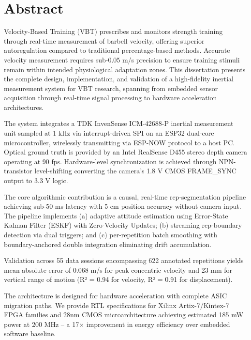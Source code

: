 \documentclass[12pt,a4paper,oneside]{book}
\begin{document}
\chapter*{Abstract}

Velocity-Based Training (VBT) prescribes and monitors strength training through real-time measurement of barbell velocity, offering superior autoregulation compared to traditional percentage-based methods. Accurate velocity measurement requires sub-0.05 m/s precision to ensure training stimuli remain within intended physiological adaptation zones. This dissertation presents the complete design, implementation, and validation of a high-fidelity inertial measurement system for VBT research, spanning from embedded sensor acquisition through real-time signal processing to hardware acceleration architectures.

The system integrates a TDK InvenSense ICM-42688-P inertial measurement unit sampled at 1 kHz via interrupt-driven SPI on an ESP32 dual-core microcontroller, wirelessly transmitting via ESP-NOW protocol to a host PC. Optical ground truth is provided by an Intel RealSense D455 stereo depth camera operating at 90 fps. Hardware-level synchronization is achieved through NPN-transistor level-shifting converting the camera's 1.8 V CMOS FRAME\_SYNC output to 3.3 V logic.

The core algorithmic contribution is a causal, real-time rep-segmentation pipeline achieving sub-50 ms latency with 5 cm position accuracy without camera input. The pipeline implements (a) adaptive attitude estimation using Error-State Kalman Filter (ESKF) with Zero-Velocity Updates; (b) streaming rep-boundary detection via dual triggers; and (c) per-repetition batch smoothing with boundary-anchored double integration eliminating drift accumulation.

Validation across 55 data sessions encompassing 622 annotated repetitions yields mean absolute error of 0.068 m/s for peak concentric velocity and 23 mm for vertical range of motion (R² = 0.94 for velocity, R² = 0.91 for displacement).

The architecture is designed for hardware acceleration with complete ASIC migration paths. We provide RTL specifications for Xilinx Artix-7/Kintex-7 FPGA families and 28nm CMOS microarchitecture achieving estimated 185 mW power at 200 MHz -- a 17× improvement in energy efficiency over embedded software baseline.
\end{document}
